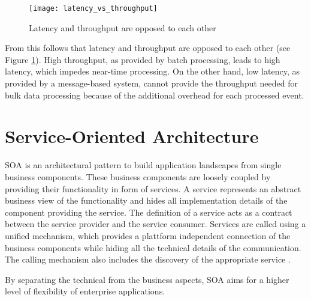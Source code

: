 \begin{figure}[htbp]
	\centering
	\texttt{[image: latency\_vs\_throughput]}
	\caption{Latency and throughput are opposed to each other}
	\label{fig:latency_vs_throughput}
\end{figure}

From this follows that latency and throughput are opposed to each other (see Figure \ref{fig:latency_vs_throughput}). High throughput, as provided by batch processing, leads to high latency, which impedes near-time processing. On the other hand, low latency, as provided by a message-based system, cannot provide the throughput needed for bulk data processing because of the additional overhead for each processed event.

\section{Service-Oriented Architecture}
\ac{SOA} is an architectural pattern to build application landscapes from single business components. These business components are loosely coupled by providing their functionality in form of services.  A service represents an abstract business view of the functionality and hides all implementation details of the component providing the service. The definition of a service acts as a contract between the service provider and the service consumer. Services are called using a unified mechanism, which provides a plattform independent connection of the business components while hiding all the technical details of the communication. The calling mechanism also includes the discovery of the appropriate service
\citep{Richter:2005ci}.

By separating the technical from the business aspects, SOA aims for a higher level of flexibility of enterprise applications.
